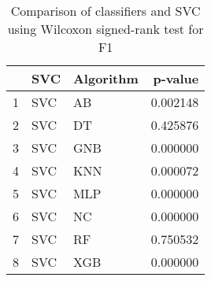 \begin{table}
\footnotesize
\caption{Comparison of classifiers and SVC using Wilcoxon signed-rank test for F1}
\label{tab:SVC wilcoxon F1 comparison}
\begin{tabular}{lllr}
\hline
 & SVC & Algorithm & p-value \\
\hline
1 & SVC & AB & 0.002148 \\
2 & SVC & DT & 0.425876 \\
3 & SVC & GNB & 0.000000 \\
4 & SVC & KNN & 0.000072 \\
5 & SVC & MLP & 0.000000 \\
6 & SVC & NC & 0.000000 \\
7 & SVC & RF & 0.750532 \\
8 & SVC & XGB & 0.000000 \\
\hline
\end{tabular}
\end{table}
